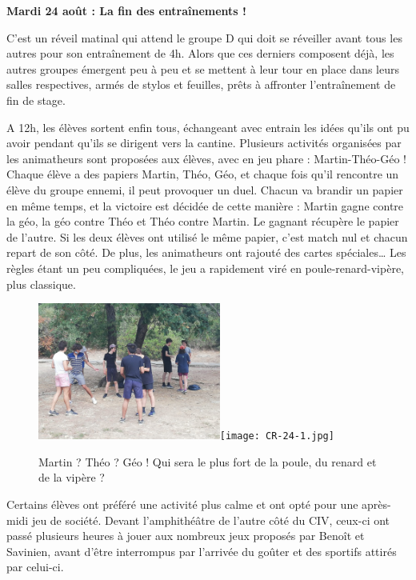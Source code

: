 \begin{center}
{\textbf{Mardi 24 août : La fin des entraînements !}}
\end{center}
\vspace{2mm}

C’est un réveil matinal qui attend le groupe D qui doit se réveiller avant tous les autres pour son entraînement de 4h. Alors que ces derniers composent déjà, les autres groupes émergent peu à peu et se mettent à leur tour en place dans leurs salles respectives, armés de stylos et feuilles, prêts à affronter l’entraînement de fin de stage. 

A 12h, les élèves sortent enfin tous, échangeant avec entrain les idées qu’ils ont pu avoir pendant qu’ils se dirigent vers la cantine. Plusieurs activités organisées par les animatheurs sont proposées aux élèves, avec en jeu phare : Martin-Théo-Géo ! Chaque élève a des papiers Martin, Théo, Géo, et chaque fois qu’il rencontre un élève du groupe ennemi, il peut provoquer un duel. Chacun va brandir un papier en même temps, et la victoire est décidée de cette manière : Martin gagne contre la géo, la géo contre Théo et Théo contre Martin. Le gagnant récupère le papier de l’autre. Si les deux élèves ont utilisé le même papier, c’est match nul et chacun repart de son côté. De plus, les animatheurs ont rajouté des cartes spéciales… Les règles étant un peu compliquées, le jeu a rapidement viré en poule-renard-vipère, plus classique. 

\begin{figure}[H]
\centering\includegraphics[width=6cm]{CR-24-0.jpg}\hspace{2cm}\texttt{[image: CR-24-1.jpg]}
\caption{Martin ? Théo ? Géo ! Qui sera le plus fort de la poule, du renard et de la vipère ?}
\end{figure}

Certains élèves ont préféré une activité plus calme et ont opté pour une après-midi jeu de société. Devant l’amphithéâtre de l’autre côté du CIV, ceux-ci ont passé plusieurs heures à jouer aux nombreux jeux proposés par Benoît et Savinien, avant d’être interrompus par l’arrivée du goûter et des sportifs attirés par celui-ci.

